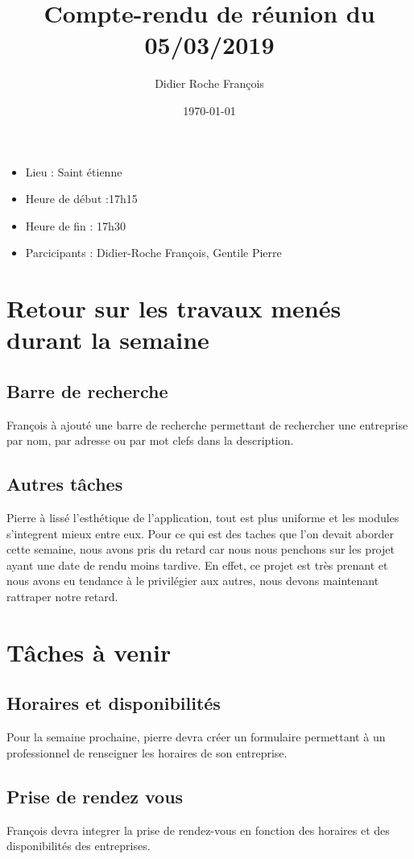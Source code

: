\documentclass[a4paper]{article}
\title{Compte-rendu de réunion du 05/03/2019}
\author{Didier Roche François}
\date{\today}
\begin{document}
\renewcommand{\contentsname}{Ordre du jour}
\maketitle
\thispagestyle{fancy}


\begin{itemize}
\item Lieu : Saint étienne
\item Heure de début :17h15
\item Heure de fin : 17h30
\item Parcicipants : Didier-Roche François, Gentile Pierre
\end{itemize}

\bigbreak
\bigbreak
\bigbreak

\tableofcontents


\newpage

\section{Retour sur les travaux menés durant la semaine}
\subsection{Barre de recherche}
François à ajouté une barre de recherche permettant de rechercher une entreprise par nom, par adresse ou par mot clefs dans la description.

\subsection{Autres tâches}
Pierre à lissé l'esthétique de l'application, tout est plus uniforme et les modules s'integrent mieux entre eux.
Pour ce qui est des taches que l'on devait aborder cette semaine, nous avons pris du retard car nous nous penchons sur les projet ayant une date de rendu moins tardive. En effet, ce projet est très prenant et nous avons eu tendance à le privilégier aux autres, nous devons maintenant rattraper notre retard.

\section{Tâches à venir}
\subsection{Horaires et disponibilités}
Pour la semaine prochaine, pierre devra créer un formulaire permettant à un professionnel de renseigner les horaires de son entreprise.
\subsection{Prise de rendez vous}
François devra integrer la prise de rendez-vous en fonction des horaires et des disponibilités des entreprises.
\end{document}
